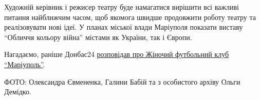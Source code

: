 Художній керівник і режисер театру буде намагатися вирішити всі важливі питання
найближчим часом, щоб якомога швидше продовжити роботу театру та реалізовувати
нові ідеї. У планах міської влади Маріуполя показати виставу \enquote{Обличчя кольору
війна} містами як України, так і Європи.


Нагадаємо, раніше Донбас24
\href{https://donbas24.news/news/zinocii-futbolnii-klub-mariupol-nasa-meta-predstavlyati-ridne-misto-na-cempionati-ukrayini}{розповідав
про Жіночий футбольний клуб \enquote{Маріуполь}}.

ФОТО: Олександра Євмененка, Галини Бабій та з особистого архіву Ольги Демідко.

